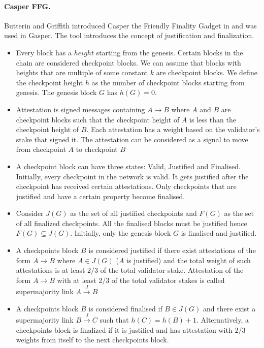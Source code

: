 \documentclass[a4paper,11pt,oneside]{article}
\theoremstyle{definition}
\begin{document}
  \paragraph{Casper FFG.}
  Butterin and Griffith introduced Casper the Friendly Finality Gadget in  \cite{CasperFFG} and was used in Gasper\cite{Gasper}. The tool introduces the concept of justification and finalization. 
  \begin{itemize}
      \item Every block has a $height$ starting from the genesis. Certain blocks in the chain are considered checkpoint blocks. We can assume that blocks with heights that are multiple of some constant $k$ are checkpoint blocks. We define the checkpoint height $h$ as the number of checkpoint blocks starting from genesis. The genesis block $G$ has $h(G) = 0$. 
      \item Attestation is signed messages containing $A \rightarrow B$ where $A$ and $B$ are checkpoint blocks such that the checkpoint height of $A$ is less than the checkpoint height of $B$. Each attestation has a weight based on the validator's stake that signed it. The attestation can be considered as a signal to move from checkpoint $A$ to checkpoint $B$
      \item A checkpoint block can have three states: Valid, Justified and Finalised. Initially, every checkpoint in the network is valid. It gets justified after the checkpoint has received certain attestations. Only checkpoints that are justified and have a certain property become finalised.  
      \item Consider $J(G)$ as the set of all justified checkpoints and $F(G)$ as the set of all finalized checkpoints. All the finalised blocks must be justified hence $F(G) \subseteq J(G)$. Initially, only the genesis block $G$ is finalised and justified. 
      \item A checkpoints block $B$ is considered justified if there exist attestations of the form $A \rightarrow B$ where $A \in J(G)$ ($A$ is justified) and the total weight of such attestations is at least $2/3$ of the total validator stake. Attestation of the form $A \rightarrow B$ with at least $2/3$ of the total validator stakes is called supermajority link $A \xrightarrow{J} B$  
      \item A checkpoints block $B$ is considered finalised if $B \in J(G)$ and there exist a supermajority link $B \xrightarrow{J} C$ such that $h(C) = h(B) + 1$. Alternatively, a checkpoints block is finalized if it is justified and has attestation with $2/3$ weights from itself to the next checkpoints block.
  \end{itemize}
\end{document}
